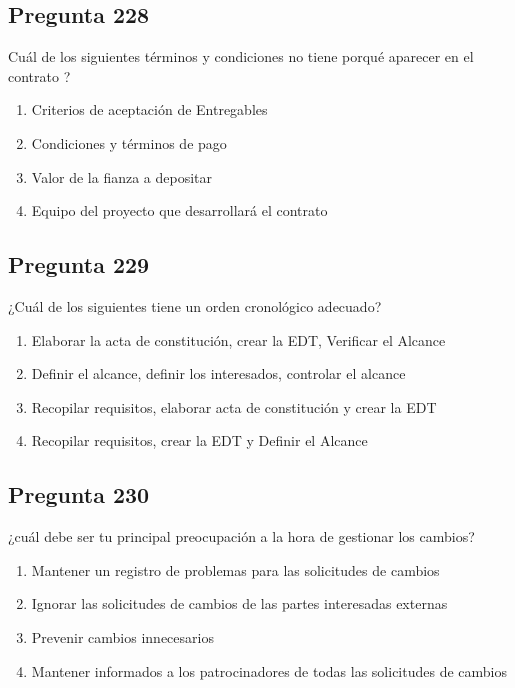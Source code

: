 \documentclass[11pt,a4paper]{article}
\begin{document}
\subsection*{Pregunta 228}
Cuál de los siguientes términos y condiciones no tiene porqué aparecer en el contrato ?

\begin{enumerate}[label=\alph*)]
  \item Criterios de aceptación de Entregables
  \item Condiciones y términos de pago
  \item Valor de la fianza a depositar
  \item Equipo del proyecto que desarrollará el contrato
\end{enumerate}

\subsection*{Pregunta 229}
¿Cuál de los siguientes tiene un orden cronológico adecuado?

\begin{enumerate}[label=\alph*)]
  \item Elaborar la acta de constitución, crear la EDT, Verificar el Alcance
  \item Definir el alcance, definir los interesados, controlar el alcance
  \item Recopilar requisitos, elaborar acta de constitución y crear la EDT
  \item Recopilar requisitos, crear la EDT y Definir el Alcance
\end{enumerate}

\subsection*{Pregunta 230}
¿cuál debe ser tu principal preocupación a la hora de gestionar los cambios?

\begin{enumerate}[label=\alph*)]
  \item Mantener un registro de problemas para las solicitudes de cambios
  \item Ignorar las solicitudes de cambios de las partes interesadas externas
  \item Prevenir cambios innecesarios
  \item Mantener informados a los patrocinadores de todas las solicitudes de cambios
\end{enumerate}
\end{document}

